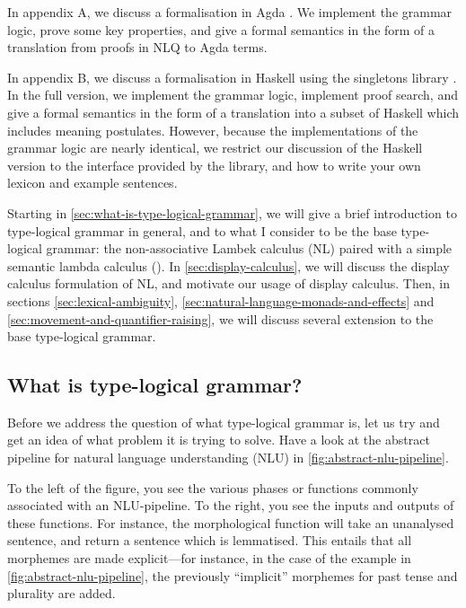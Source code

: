 In appendix A, we discuss a formalisation in Agda \citep{norell2009}.
We implement the grammar logic, prove some key properties, and give a
formal semantics in the form of a translation from proofs in NLQ to
Agda terms.

In appendix B, we discuss a formalisation in Haskell
\citep{marlow2010} using the singletons library
\citet{eisenberg2012}. In the full version, we implement the grammar
logic, implement proof search, and give a formal semantics in the form
of a translation into a subset of Haskell which includes meaning
postulates. However, because the implementations of the grammar logic
are nearly identical, we restrict our discussion of the Haskell
version to the interface provided by the library, and how to write
your own lexicon and example sentences.

Starting in \autoref{sec:what-is-type-logical-grammar}, we will give a
brief introduction to type-logical grammar in general, and to what I
consider to be the base type-logical grammar: the non-associative
Lambek calculus (NL) paired with a simple semantic lambda calculus
(\lamET).
In \autoref{sec:display-calculus}, we will discuss the display
calculus formulation of NL, and motivate our usage of display
calculus.
Then, in sections \ref{sec:lexical-ambiguity},
\ref{sec:natural-language-monads-and-effects} and
\ref{sec:movement-and-quantifier-raising}, we will discuss several
extension to the base type-logical grammar.

\subsection{What is type-logical grammar?}
\label{sec:what-is-type-logical-grammar}

Before we address the question of what type-logical grammar is, let us
try and get an idea of what problem it is trying to solve. Have a look
at the abstract pipeline for natural language understanding (NLU) in
\autoref{fig:abstract-nlu-pipeline}.



To the left of the figure, you see the various phases or functions
commonly associated with an NLU-pipeline. To the right, you see the
inputs and outputs of these functions.
For instance, the morphological function will take an unanalysed
sentence, and return a sentence which is lemmatised. This entails that
all morphemes are made explicit---for instance, in the case of the
example in \autoref{fig:abstract-nlu-pipeline}, the previously
``implicit'' morphemes for past tense and plurality are added.

